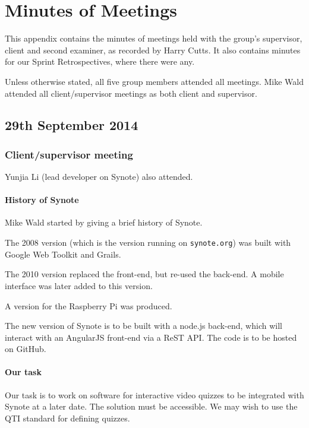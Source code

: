 \chapter{Minutes of Meetings} \label{Chapter:Minutes of Meetings}

This appendix contains the minutes of meetings held with the group's supervisor, client and second examiner, as recorded by Harry Cutts. It also contains minutes for our Sprint Retrospectives, where there were any.

Unless otherwise stated, all five group members attended all meetings. Mike Wald attended all client/supervisor meetings as both client and supervisor.

\section{29th September 2014}\label{Minutes:2014-09-29}

\subsection{Client/supervisor meeting}

Yunjia Li (lead developer on Synote) also attended.

\subsubsection{History of Synote}

Mike Wald started by giving a brief history of Synote.

The 2008 version (which is the version running on \texttt{synote.org})
was built with Google Web Toolkit and Grails.

The 2010 version replaced the front-end, but re-used the back-end. A
mobile interface was later added to this version.

A version for the Raspberry Pi was produced.

The new version of Synote is to be built with a node.js back-end, which
will interact with an AngularJS front-end via a ReST API. The code is to
be hosted on GitHub.

\subsubsection{Our task}

Our task is to work on software for interactive video quizzes to be
integrated with Synote at a later date. The solution must be accessible.
We may wish to use the QTI standard for defining quizzes.

